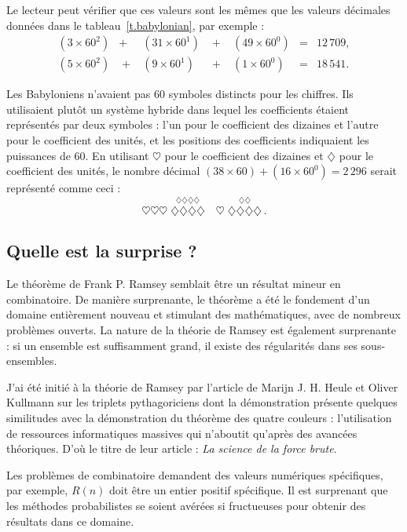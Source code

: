 Le lecteur peut vérifier que ces valeurs sont les mêmes que les valeurs décimales données dans le tableau~\ref{t.babylonian}, par exemple :
\[
\renewcommand{\arraystretch}{1.3}
\begin{array}{lclclcr}
(3\times 60^2) &+& (31\times 60^1) &\;+\;& (49\times 60^0) &=&   12\,709,\\
(5\times 60^2) &\;+\;& (9\times 60^1) &\;+\;& (1\times 60^0) &=& 18\,541.
\end{array}
\]

Les Babyloniens n'avaient pas $60$ symboles distincts pour les chiffres. Ils utilisaient plutôt un système hybride dans lequel les coefficients étaient représentés par deux symboles : l'un pour le coefficient des dizaines et l'autre pour le coefficient des unités, et les positions des coefficients indiquaient les puissances de 60. En utilisant $\heartsuit$ pour le coefficient des dizaines et $\diamondsuit$ pour le coefficient des unités, le nombre décimal $(38\times 60)+(16\times 60^0)=2\,296$ serait représenté comme ceci :
\[
\heartsuit\heartsuit\heartsuit \; \stackrel{\displaystyle\diamondsuit\diamondsuit\diamondsuit\diamondsuit}{\diamondsuit\diamondsuit\diamondsuit\diamondsuit}
\quad
\heartsuit \; \stackrel{\displaystyle\diamondsuit\diamondsuit}{\diamondsuit\diamondsuit\diamondsuit\diamondsuit}\,.
\]


\subsection*{Quelle est la surprise ?}

Le théorème de Frank P. Ramsey semblait être un résultat mineur en combinatoire. De manière surprenante, le théorème a été le fondement d'un domaine entièrement nouveau et stimulant des mathématiques, avec de nombreux problèmes ouverts. La nature de la théorie de Ramsey est également surprenante : si un ensemble est suffisamment grand, il existe des régularités dans ses sous-ensembles.

J'ai été initié à la théorie de Ramsey par l'article de Marijn J. H. Heule et Oliver Kullmann sur les triplets pythagoriciens dont la démonstration présente quelques similitudes avec la démonstration du théorème des quatre couleurs : l'utilisation de ressources informatiques massives qui n'aboutit qu'après des avancées théoriques. D'où le titre de leur article : \textit{La science de la force brute}.

Les problèmes de combinatoire demandent des valeurs numériques spécifiques, par exemple, $R(n)$ doit être un entier positif spécifique. Il est surprenant que les méthodes probabilistes se soient avérées si fructueuses pour obtenir des résultats dans ce domaine.

